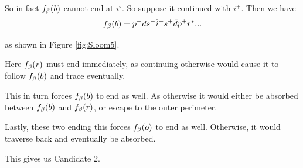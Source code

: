 So in fact $f_\beta(b)$ cannot end at $i^\circ$. So suppose it continued with $i^+$. Then we have
\[
f_\beta(b) = p^- d s^- \hat{i}^+ s^+ \bar{d} p^+ r^*...
\]

as shown in Figure \ref{fig:Sloom5}.

Here $f_\beta(r)$ must end immediately, as continuing otherwise would cause it to follow $f_\beta(b)$ and trace eventually.

This in turn forces $f_\beta(b)$ to end as well. As otherwise it would either be absorbed between $f_\beta(b)$ and $f_\beta(r)$, or escape to the outer perimeter.

Lastly, these two ending this forces $f_\beta(o)$ to end as well. Otherwise, it would traverse back and eventually be absorbed.

This gives us Candidate 2.








